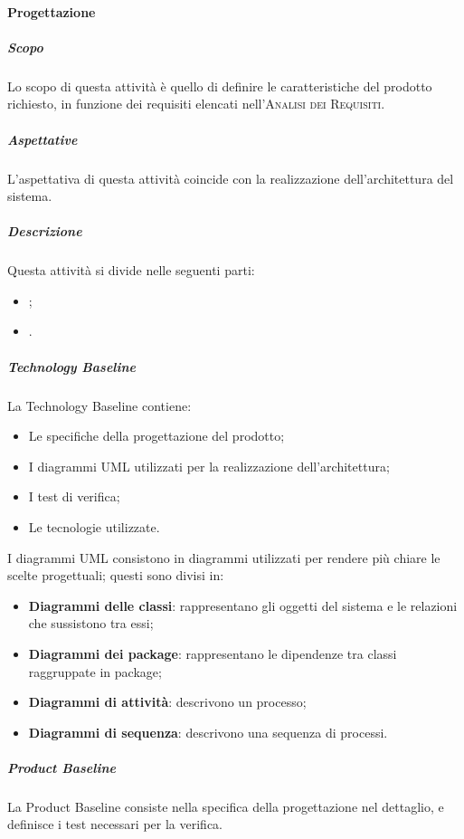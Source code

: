\documentclass[../norme-di-progetto.tex]{subfiles}
\begin{document}
\paragraph{Progettazione}
\subparagraph{Scopo}
Lo scopo di questa attività è quello di definire le caratteristiche del prodotto richiesto, in funzione dei requisiti elencati nell'\textsc{Analisi dei Requisiti}.
\subparagraph{Aspettative}
L'aspettativa di questa attività coincide con la realizzazione dell'architettura del sistema.
\subparagraph{Descrizione}
Questa attività si divide nelle seguenti parti:
\begin{itemize}
  \item \textbf{};
  \item \textbf{}.
\end{itemize}
\subparagraph*{Technology Baseline}
La Technology Baseline contiene:
\begin{itemize}
  \item Le specifiche della progettazione del prodotto;
  \item I diagrammi UML utilizzati per la realizzazione dell'architettura;
  \item I test di verifica;
  \item Le tecnologie utilizzate.
\end{itemize}
I diagrammi UML consistono in diagrammi utilizzati per rendere più chiare le scelte progettuali; questi sono divisi in:
\begin{itemize}
  \item \textbf{Diagrammi delle classi}: rappresentano gli oggetti del sistema e le relazioni che sussistono tra essi;
  \item \textbf{Diagrammi dei package}: rappresentano le dipendenze tra classi raggruppate in package;
  \item \textbf{Diagrammi di attività}: descrivono un processo;
  \item \textbf{Diagrammi di sequenza}: descrivono una sequenza di processi.
\end{itemize}

\subparagraph*{Product Baseline}
La Product Baseline consiste nella specifica della progettazione nel dettaglio, e definisce i test necessari per la verifica.
\end{document}
